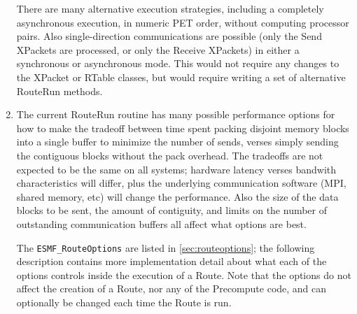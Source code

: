 \begin{enumerate}
There are many alternative execution strategies, including a
completely asynchronous execution, in numeric PET order, without
computing processor pairs.  Also single-direction communications 
are possible (only the Send XPackets are processed, or only
the Receive XPackets) in either a synchronous or asynchronous mode.  
This would not require any changes to the XPacket or RTable classes,
but would require writing a set of alternative RouteRun methods.

\item

The current RouteRun routine has many possible performance options for how
to make the tradeoff between time spent packing disjoint memory
blocks into a single buffer to minimize the number of sends,
verses simply sending the contiguous blocks without the pack overhead.
The tradeoffs are not expected to be the same on all systems;
hardware latency verses bandwith characteristics will differ,
plus the underlying communication software (MPI, shared memory, etc)
will change the performance.  Also the size of the data blocks
to be sent, the amount of contiguity, and limits on the number 
of outstanding communication buffers all affect what options are best.

The {\tt ESMF\_RouteOptions} are listed in \ref{sec:routeoptions}; 
the following description contains more implementation detail 
about what each of the options
controls inside the execution of a Route.  Note that the options
do not affect the creation of a Route, nor any of the Precompute
code, and can optionally be changed each time the Route is run.


\end{enumerate}
